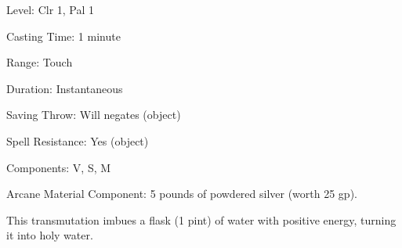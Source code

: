
\begin{description*}
\item[Level:] Clr 1, Pal 1
\item[Casting Time:] 1 minute
\item[Range:] Touch
\item[Duration:] Instantaneous
\item[Saving Throw:] Will negates (object)
\item[Spell Resistance:] Yes (object)
\item[Components:] V, S, M
\item[Arcane Material Component:] 5 pounds of powdered silver (worth 25 gp).
\end{description*}

This transmutation imbues a flask (1 pint) of water with positive energy, turning
it into holy water.